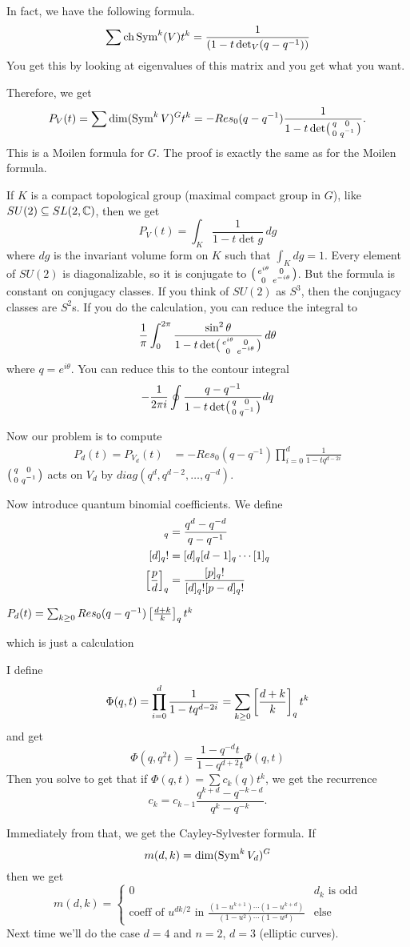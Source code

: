 In fact, we have the following formula.
\[
 \sum \operatorname{ch} \operatorname{Sym}^k(V) t^k = \frac{1}{(1-t\det_V(q-q^{-1}))}
\]
You get this by looking at eigenvalues of this matrix and you get what you want.

Therefore, we get
\[
 P_V(t)=\sum \dim(\operatorname{Sym}^k V)^G t^k = -Res_0(q-q^{-1}) \frac{1}{1-t\det\bigl(\begin{smallmatrix} q&0\\ 0&q^{-1} \end{smallmatrix}\bigr)}.
\]
This is a Moilen formula for $G$. The proof is exactly the same as for the Moilen formula.

\begin{remark}
 If $K$ is a compact topological group (maximal compact group in $G$), like $SU(2)\subseteq SL(2,\mathbb{C})$, then we get
 \[
  P_V(t) = \int_K \frac{1}{1-t\det g}\, dg
 \]
 where $dg$ is the invariant volume form on $K$ such that $\int_K dg=1$. Every element of $SU(2)$ is diagonalizable, so it is conjugate to $\bigl(\begin{smallmatrix} e^{i\theta}&0\\ 0& e^{-i\theta} \end{smallmatrix}\bigr)$. But the formula is constant on conjugacy classes. If you think of $SU(2)$ as $S^3$, then the conjugacy classes are $S^2$s. If you do the calculation, you can reduce the integral to
 \[
  \frac{1}{\pi} \int_0^{2\pi} \frac{\sin^2\theta}{1-t\det\bigl(\begin{smallmatrix} e^{i\theta}&0\\ 0&e^{-i\theta} \end{smallmatrix}\bigr)}\,d\theta
 \]
 where $q=e^{i\theta}$. You can reduce this to the contour integral
 \[
  -\frac{1}{2\pi i}\oint \frac{q-q^{-1}}{1-t\det\bigl(\begin{smallmatrix} q&0\\ 0&q^{-1} \end{smallmatrix}\bigr)}dq
 \] 
\end{remark}

Now our problem is to compute
\begin{align*}
 P_d(t)=P_{V_d}(t) &= -Res_0 (q-q^{-1}) \prod_{i=0}^d \frac{1}{1-tq^{d-2i}}
\end{align*}
$\bigl(\begin{smallmatrix} q&0\\ 0&q^{-1} \end{smallmatrix}\bigr)$ acts on $V_d$ by $diag(q^d,q^{d-2},\dots, q^{-d})$.

Now introduce quantum binomial coefficients. We define
\begin{align*}
 [d]_q &= \frac{q^d-q^{-d}}{q-q^{-1}}\\
 [d]_q! &= [d]_q[d-1]_q\cdots [1]_q\\
 \qbinom{p}{d} &= \frac{[p]_q!}{[d]_q![p-d]_q!}
\end{align*}
\begin{claim}
 $P_d(t)=\sum_{k\ge 0} Res_0(q-q^{-1}) \left[\frac{d+k}{k}\right]_q t^k$
\end{claim}
which is just a calculation

I define
\[
 \Phi(q,t) = \prod_{i=0}^d \frac{1}{1-tq^{d-2i}} = \sum_{k\ge 0} \left[\frac{d+k}{k}\right]_q t^k
\]
and get
\[
 \Phi(q,q^2t) = \frac{1-q^{-d}t}{1-q^{d+2}t} \Phi(q,t)
\]
Then you solve to get that if $\Phi(q,t)=\sum c_k(q)t^k$, we get the recurrence
\[
 c_k=c_{k-1} \frac{q^{k+d}-q^{-k-d}}{q^k-q^{-k}}.
\]

Immediately from that, we get the Cayley-Sylvester formula. If 
\[
 m(d,k)=\dim (\operatorname{Sym}^k V_d)^G
\]
then we get
\[
 m(d,k)=
 \begin{cases}
  0 & d_k \text{ is odd}\\
  \text{coeff of }u^{dk/2}\text{ in }\frac{(1-u^{k+1})\cdots (1-u^{k+d})}{(1-u^2)\cdots (1-u^d)} & \text{else}
 \end{cases}
\]
Next time we'll do the case $d=4$ and $n=2$, $d=3$ (elliptic curves).